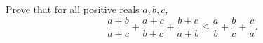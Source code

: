 Prove that for all positive reals $a,b,c$,
\[
\dfrac{a+b}{a+c}+\dfrac{a+c}{b+c}+\dfrac{b+c}{a+b}\le\dfrac{a}{b}+\dfrac{b}{c}+\dfrac{c}{a}.
\]
